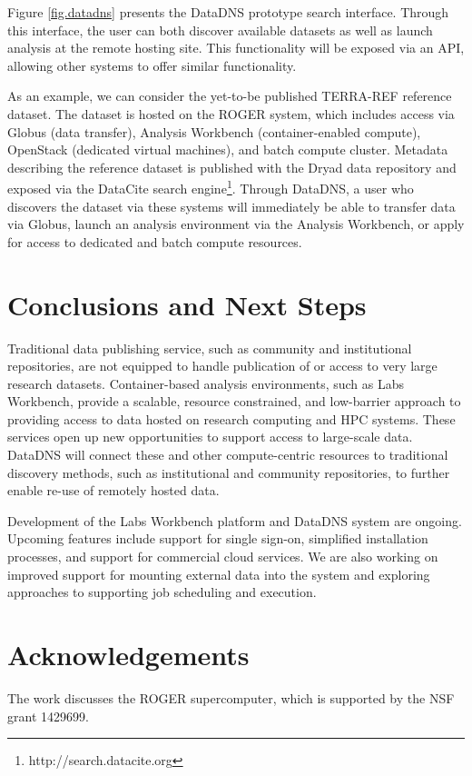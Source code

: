 \documentclass{sig-alternate}
\begin{document}
Figure \ref{fig.datadns} presents the DataDNS prototype search interface. Through this interface, the user can both discover available datasets as well as launch analysis at the remote hosting site. This functionality will be exposed via an API, allowing other systems to offer similar functionality.

As an example, we can consider the yet-to-be published TERRA-REF reference dataset. The dataset is hosted on the ROGER system, which includes access via Globus (data transfer), Analysis Workbench (container-enabled compute), OpenStack (dedicated virtual machines), and batch compute cluster.  Metadata describing the reference dataset is published with the Dryad data repository and exposed via the DataCite search engine\footnote{http://search.datacite.org}. Through DataDNS, a user who discovers the dataset via these systems will immediately be able to transfer data via Globus, launch an analysis environment via the Analysis Workbench, or apply for access to dedicated and batch compute resources.


\section{Conclusions and Next Steps}

Traditional data publishing service, such as community and institutional repositories, are not equipped to handle publication of or access to very large research datasets.  Container-based analysis environments, such as Labs Workbench, provide a scalable, resource constrained, and low-barrier approach to providing access to data hosted on research computing and HPC systems. These services open up  new opportunities to support access to large-scale data.  DataDNS will connect these and other compute-centric resources to traditional discovery methods, such as institutional and community repositories, to further enable re-use of remotely hosted data.


Development of the Labs Workbench platform and DataDNS system are ongoing.  Upcoming features include support for single sign-on, simplified installation processes, and support for commercial cloud services. We are also working on improved support for mounting external data into the system and exploring approaches to supporting job scheduling and execution.

\section{Acknowledgements}
The work discusses the ROGER supercomputer, which is supported by the NSF grant 1429699. 


  
\end{document}
